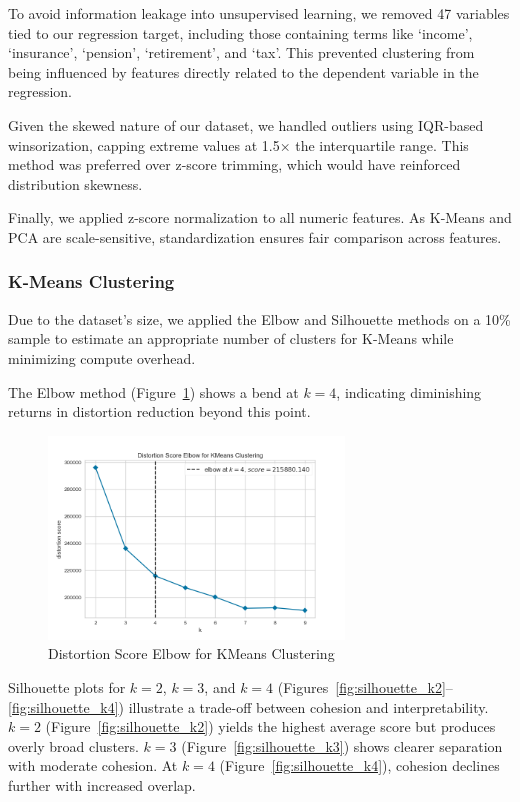 \documentclass{article}
\begin{document}
To avoid information leakage into unsupervised learning, we removed 47 variables tied to our regression target, including those containing terms like ‘income’, ‘insurance’, ‘pension’, ‘retirement’, and ‘tax’. This prevented clustering from being influenced by features directly related to the dependent variable in the regression.

Given the skewed nature of our dataset, we handled outliers using IQR-based winsorization, capping extreme values at 1.5× the interquartile range. This method was preferred over z-score trimming, which would have reinforced distribution skewness.

Finally, we applied z-score normalization to all numeric features. As K-Means and PCA are scale-sensitive, standardization ensures fair comparison across features.

\subsubsection{K-Means Clustering}

Due to the dataset’s size, we applied the Elbow and Silhouette methods on a 10\% sample to estimate an appropriate number of clusters for K-Means while minimizing compute overhead.

The Elbow method (Figure~\ref{fig:elbow}) shows a bend at $k=4$, indicating diminishing returns in distortion reduction beyond this point.

\begin{figure}[H]
    \centering
    \includegraphics[width=0.7\textwidth]{figures/elbow_plot.png}
    \caption{Distortion Score Elbow for KMeans Clustering}
    \label{fig:elbow}
\end{figure}

Silhouette plots for $k=2$, $k=3$, and $k=4$ (Figures~\ref{fig:silhouette_k2}–\ref{fig:silhouette_k4}) illustrate a trade-off between cohesion and interpretability. $k=2$ (Figure~\ref{fig:silhouette_k2}) yields the highest average score but produces overly broad clusters. $k=3$ (Figure~\ref{fig:silhouette_k3}) shows clearer separation with moderate cohesion. At $k=4$ (Figure~\ref{fig:silhouette_k4}), cohesion declines further with increased overlap.
\end{document}
